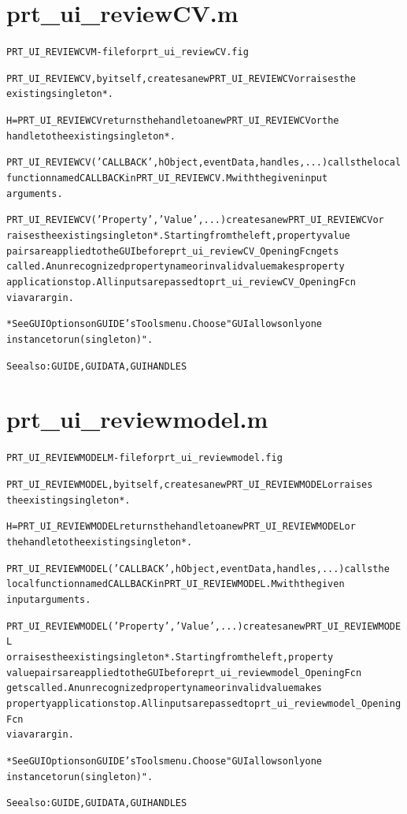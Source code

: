 \section{prt\_ui\_reviewCV.m}
\begin{alltt}

 PRT\_UI\_REVIEWCV M-file for prt\_ui\_reviewCV.fig
 
 PRT\_UI\_REVIEWCV, by itself, creates a new PRT\_UI\_REVIEWCV or raises the 
 existing singleton*.
 
 H = PRT\_UI\_REVIEWCV returns the handle to a new PRT\_UI\_REVIEWCV or the 
 handle to the existing singleton*.
 
 PRT\_UI\_REVIEWCV('CALLBACK',hObject,eventData,handles,...) calls the local
 function named CALLBACK in PRT\_UI\_REVIEWCV.M with the given input 
 arguments.
 
 PRT\_UI\_REVIEWCV('Property','Value',...) creates a new PRT\_UI\_REVIEWCV or 
 raises the existing singleton*.  Starting from the left, property value 
 pairs are applied to the GUI before prt\_ui\_reviewCV\_OpeningFcn gets 
 called.  An unrecognized property name or invalid value makes property 
 application stop.  All inputs are passed to prt\_ui\_reviewCV\_OpeningFcn 
 via varargin.
 
 *See GUI Options on GUIDE's Tools menu.  Choose "GUI allows only one
 instance to run (singleton)".
 
 See also: GUIDE, GUIDATA, GUIHANDLES
\end{alltt}


\section{prt\_ui\_reviewmodel.m}
\begin{alltt}

 PRT\_UI\_REVIEWMODEL M-file for prt\_ui\_reviewmodel.fig
 
 PRT\_UI\_REVIEWMODEL, by itself, creates a new PRT\_UI\_REVIEWMODEL or raises
 the existing singleton*.
 
 H = PRT\_UI\_REVIEWMODEL returns the handle to a new PRT\_UI\_REVIEWMODEL or 
 the handle to the existing singleton*.
 
 PRT\_UI\_REVIEWMODEL('CALLBACK',hObject,eventData,handles,...) calls the 
 local function named CALLBACK in PRT\_UI\_REVIEWMODEL.M with the given 
 input arguments.
 
 PRT\_UI\_REVIEWMODEL('Property','Value',...) creates a new PRT\_UI\_REVIEWMODEL
 or raises the existing singleton*.  Starting from the left, property 
 value pairs are applied to the GUI before prt\_ui\_reviewmodel\_OpeningFcn 
 gets called.  An unrecognized property name or invalid value makes 
 property application stop.  All inputs are passed to prt\_ui\_reviewmodel\_OpeningFcn
 via varargin.
 
 *See GUI Options on GUIDE's Tools menu.  Choose "GUI allows only one
  instance to run (singleton)".
 
 See also: GUIDE, GUIDATA, GUIHANDLES
\end{alltt}


